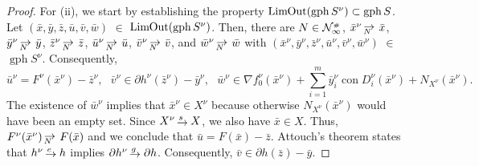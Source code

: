\documentclass[smallextended,envcountsect]{svjour3}
\newcommand{\nOutLim}{\mathop{\rm Lim\hspace{-0.01cm}Out}\nolimits}
\newcommand{\cN}{{\cal N}}
\newcommand{\grill}{{\scriptscriptstyle\#}}
\DeclareMathOperator{\con}{con}
\DeclareMathOperator{\gph}{gph}
\newcommand{\sto}{\,{\lower 1pt\hbox{$\rightarrow$}}\kern -10pt
     \hbox{\raise 4pt \hbox{$\, \scriptstyle s$}}\hskip7pt}
\newcommand{\eto}{\,{\lower 1pt\hbox{$\rightarrow$}}\kern -10pt
     \hbox{\raise 4pt \hbox{$\, \scriptstyle e$}}\hskip7pt}
\newcommand{\gto}{\,{\lower 1pt\hbox{$\rightarrow$}}\kern -10pt
     \hbox{\raise 4.5pt \hbox{$\, \scriptstyle g$}}\hskip7pt}
\def\Nto{\,{\raise 1pt\hbox{$\rightarrow$}}\kern -12pt
     \hbox{\lower 3pt \hbox{$\, \scriptstyle N$}}\hskip7pt}
\begin{document}
 \begin{proof} For (ii), we start by establishing the property $\nOutLim (\gph S^\nu) \subset \gph S$. Let $(\bar x, \bar y, \bar z, \bar u, \bar v, \bar w)$ $\in$ $\nOutLim (\gph S^\nu)$.  Then, there are $N\in \cN_\infty^\grill$, $\bar x^\nu\Nto \bar x$, $\bar y^\nu\Nto \bar y$, $\bar z^\nu\Nto \bar z$, $\bar u^\nu\Nto \bar u$, $\bar v^\nu\Nto \bar v$, and $\bar w^\nu\Nto \bar w$ with
$(\bar x^\nu, \bar y^\nu, \bar z^\nu, \bar u^\nu, \bar v^\nu, \bar w^\nu)$ $\in$ $\gph S^\nu$. Consequently,
\[
\bar u^\nu = F^\nu(\bar x^\nu) - \bar z^\nu, ~~~ \bar v^\nu \in \partial h^\nu(\bar z^\nu)- \bar y^\nu, ~~~ \bar w^\nu \in \nabla f_0^\nu(\bar x^\nu) + \sum_{i=1}^m \bar y_i^\nu \con D_i^\nu(\bar x^\nu) + N_{X^\nu}(\bar x^\nu).
\]
The existence of $\bar w^\nu$ implies that $\bar x^\nu\in X^\nu$ because otherwise $N_{X^\nu}(\bar x^\nu)$ would have been an empty set. Since $X^\nu\sto X$, we also have $\bar x\in X$. Thus,  $F^\nu(\bar x^\nu)\Nto F(\bar x)$ and we conclude that $\bar u = F(\bar x) - \bar z$. Attouch's theorem \cite[Theorem 12.35]{Rockafellar_Wets_1998} states that $h^\nu \eto h$ implies $\partial h^\nu \gto \partial h$. Consequently, $\bar v \in \partial h(\bar z) - \bar y$.


\end{proof}
\end{document}
